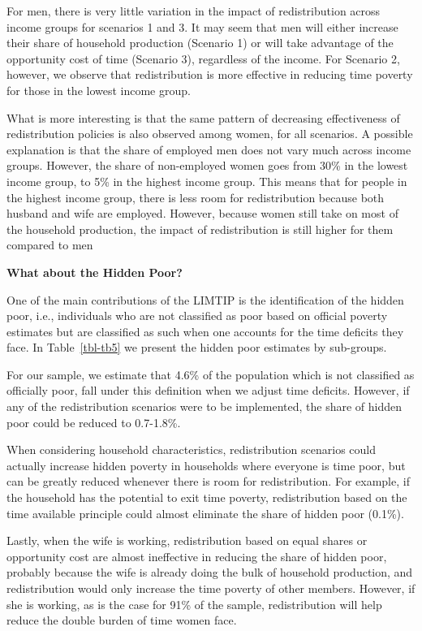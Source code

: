 \documentclass[
  11pt,
]{article}
\begin{document}
For men, there is very little variation in the impact of redistribution
across income groups for scenarios 1 and 3. It may seem that men will
either increase their share of household production (Scenario 1) or will
take advantage of the opportunity cost of time (Scenario 3), regardless
of the income. For Scenario 2, however, we observe that redistribution
is more effective in reducing time poverty for those in the lowest
income group.

What is more interesting is that the same pattern of decreasing
effectiveness of redistribution policies is also observed among women,
for all scenarios. A possible explanation is that the share of employed
men does not vary much across income groups. However, the share of
non-employed women goes from 30\% in the lowest income group, to 5\% in
the highest income group. This means that for people in the highest
income group, there is less room for redistribution because both husband
and wife are employed. However, because women still take on most of the
household production, the impact of redistribution is still higher for
them compared to men

\textbf{What about the Hidden Poor?}

One of the main contributions of the LIMTIP is the identification of the
hidden poor, i.e., individuals who are not classified as poor based on
official poverty estimates but are classified as such when one accounts
for the time deficits they face. In Table~\ref{tbl-tb5} we present the
hidden poor estimates by sub-groups.

For our sample, we estimate that 4.6\% of the population which is not
classified as officially poor, fall under this definition when we adjust
time deficits. However, if any of the redistribution scenarios were to
be implemented, the share of hidden poor could be reduced to 0.7-1.8\%.

When considering household characteristics, redistribution scenarios
could actually increase hidden poverty in households where everyone is
time poor, but can be greatly reduced whenever there is room for
redistribution. For example, if the household has the potential to exit
time poverty, redistribution based on the time available principle could
almost eliminate the share of hidden poor (0.1\%).

Lastly, when the wife is working, redistribution based on equal shares
or opportunity cost are almost ineffective in reducing the share of
hidden poor, probably because the wife is already doing the bulk of
household production, and redistribution would only increase the time
poverty of other members. However, if she is working, as is the case for
91\% of the sample, redistribution will help reduce the double burden of
time women face.
\end{document}
